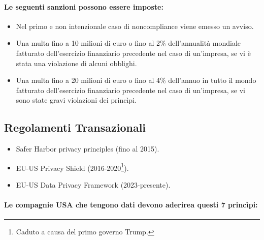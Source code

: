 \paragraph{Le seguenti sanzioni possono essere imposte:}

\begin{itemize}
  \item Nel primo e non intenzionale caso di noncompliance viene emesso un avviso. 
  \item Una multa fino a 10 milioni di euro o fino al 2\% dell'annualità mondiale fatturato dell'esercizio finanziario precedente nel caso di un'impresa, se vi è stata una violazione di alcuni obblighi. 
  \item Una multa fino a 20 milioni di euro o fino al 4\% dell'annuo in tutto il mondo fatturato dell'esercizio finanziario precedente nel caso di un'impresa, se vi sono state gravi violazioni dei princìpi.
\end{itemize}

\subsection{Regolamenti Transazionali}

\begin{itemize}
  \item Safer Harbor privacy principles (fino al 2015). 
  \item EU-US Privacy Shield (2016-2020\footnote{Caduto a causa del primo governo Trump.}). 
  \item EU-US Data Privacy Framework (2023-presente).
\end{itemize}


\paragraph{Le compagnie USA che tengono dati devono aderirea questi 7 princìpi:}

